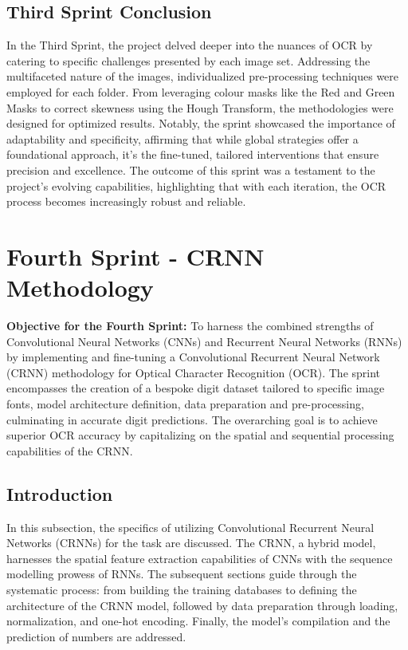 \subsection{Third Sprint Conclusion}

In the Third Sprint, the project delved deeper into the nuances of OCR by catering to specific challenges presented by each image set. Addressing the multifaceted nature of the images, individualized pre-processing techniques were employed for each folder. From leveraging colour masks like the Red and Green Masks to correct skewness using the Hough Transform, the methodologies were designed for optimized results. Notably, the sprint showcased the importance of adaptability and specificity, affirming that while global strategies offer a foundational approach, it's the fine-tuned, tailored interventions that ensure precision and excellence. The outcome of this sprint was a testament to the project's evolving capabilities, highlighting that with each iteration, the OCR process becomes increasingly robust and reliable.

\newpage

\section{Fourth Sprint - CRNN Methodology}

\textbf{Objective for the Fourth Sprint:} To harness the combined strengths of Convolutional Neural Networks (CNNs) and Recurrent Neural Networks (RNNs) by implementing and fine-tuning a Convolutional Recurrent Neural Network (CRNN) methodology for Optical Character Recognition (OCR). The sprint encompasses the creation of a bespoke digit dataset tailored to specific image fonts, model architecture definition, data preparation and pre-processing, culminating in accurate digit predictions. The overarching goal is to achieve superior OCR accuracy by capitalizing on the spatial and sequential processing capabilities of the CRNN.

\subsection{Introduction}

In this subsection, the specifics of utilizing Convolutional Recurrent Neural Networks (CRNNs) for the task are discussed. The CRNN, a hybrid model, harnesses the spatial feature extraction capabilities of CNNs with the sequence modelling prowess of RNNs. The subsequent sections guide through the systematic process: from building the training databases to defining the architecture of the CRNN model, followed by data preparation through loading, normalization, and one-hot encoding. Finally, the model's compilation and the prediction of numbers are addressed.


